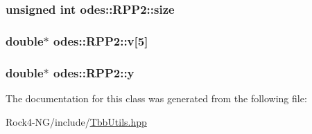 \hypertarget{classodes_1_1RPP2_ad771c8666aed14f8cc5dc5f1c88bb624}{
\subsubsection[{size}]{\setlength{\rightskip}{0pt plus 5cm}unsigned int odes\-::\-R\-P\-P2\-::size\hspace{0.3cm}{\ttfamily [private]}}}\label{classodes_1_1RPP2_ad771c8666aed14f8cc5dc5f1c88bb624}
\hypertarget{classodes_1_1RPP2_a7d2380ce59f91fc9f17515def88ec8b3}{
\subsubsection[{v}]{\setlength{\rightskip}{0pt plus 5cm}double$\ast$ odes\-::\-R\-P\-P2\-::v\mbox{[}5\mbox{]}\hspace{0.3cm}{\ttfamily [private]}}}\label{classodes_1_1RPP2_a7d2380ce59f91fc9f17515def88ec8b3}
\hypertarget{classodes_1_1RPP2_a0e3a828108fc0402fd9701866043d3f4}{
\subsubsection[{y}]{\setlength{\rightskip}{0pt plus 5cm}double$\ast$ odes\-::\-R\-P\-P2\-::y\hspace{0.3cm}{\ttfamily [private]}}}\label{classodes_1_1RPP2_a0e3a828108fc0402fd9701866043d3f4}


The documentation for this class was generated from the following file\-:\begin{DoxyCompactItemize}
\item 
Rock4-\/\-N\-G/include/\hyperlink{TbbUtils_8hpp}{Tbb\-Utils.\-hpp}\end{DoxyCompactItemize}
